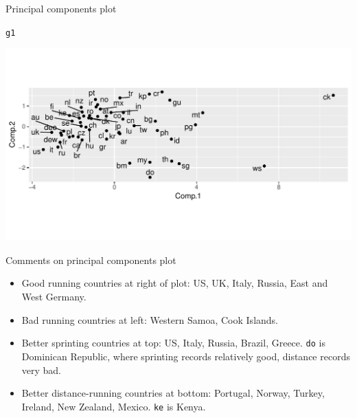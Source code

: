 \documentclass[unknownkeysallowed]{beamer}\usepackage[]{graphicx}\usepackage[]{color}
\makeatletter
\def\maxwidth{ %
  \ifdim\Gin@nat@width>\linewidth
    \linewidth
  \else
    \Gin@nat@width
  \fi
}
\newcommand{\hlstd}[1]{\textcolor[rgb]{0.345,0.345,0.345}{#1}}%
\newenvironment{kframe}{%
 \def\at@end@of@kframe{}%
 \ifinner\ifhmode%
  \def\at@end@of@kframe{\end{minipage}}%
  \begin{minipage}{\columnwidth}%
 \fi\fi%
 \def\FrameCommand##1{\hskip\@totalleftmargin \hskip-\fboxsep
 \colorbox{shadecolor}{##1}\hskip-\fboxsep
     \hskip-\linewidth \hskip-\@totalleftmargin \hskip\columnwidth}%
 \MakeFramed {\advance\hsize-\width
   \@totalleftmargin\z@ \linewidth\hsize
   \@setminipage}}%
 {\par\unskip\endMakeFramed%
 \at@end@of@kframe}
\newenvironment{knitrout}{}{} %
\makeatother
\begin{document}
\begin{frame}{Principal components plot}

\begin{knitrout}
\color{fgcolor}\begin{kframe}
\begin{alltt}
\hlstd{g1}
\end{alltt}
\end{kframe}
\includegraphics[width=\maxwidth]{figure/lecce-1} 

\end{knitrout}

  
\end{frame}

\begin{frame}[fragile]{Comments on principal components plot}
  
  \begin{itemize}
  \item Good running countries at right of plot: US, UK, Italy,
    Russia, East and West Germany.
  \item Bad running countries at left: Western Samoa, Cook Islands.
  \item Better sprinting countries at top: US, Italy, Russia,
    Brazil, Greece. \texttt{do} is Dominican Republic, where sprinting
    records relatively good, distance records very bad.
  \item Better distance-running countries at bottom: Portugal, Norway,
    Turkey, Ireland, New Zealand, Mexico. \texttt{ke} is Kenya.
  \end{itemize}
  
\end{frame}
\end{document}
